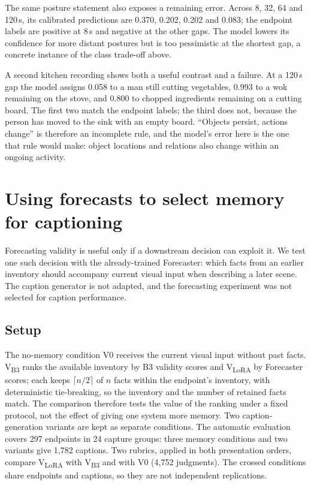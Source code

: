 \documentclass[10pt]{article}
\begin{document}
The same posture statement also exposes a remaining error. Across 8, 32, 64 and 120\,s, its calibrated predictions are 0.370, 0.202, 0.202 and 0.083; the endpoint labels are positive at 8\,s and negative at the other gaps. The model lowers its confidence for more distant postures but is too pessimistic at the shortest gap, a concrete instance of the class trade-off above.

A second kitchen recording shows both a useful contrast and a failure. At a 120\,s gap the model assigns 0.058 to a man still cutting vegetables, 0.993 to a wok remaining on the stove, and 0.800 to chopped ingredients remaining on a cutting board. The first two match the endpoint labels; the third does not, because the person has moved to the sink with an empty board. ``Objects persist, actions change'' is therefore an incomplete rule, and the model's error here is the one that rule would make: object locations and relations also change within an ongoing activity.

\section{Using forecasts to select memory for captioning}
\label{sec:captioning}

Forecasting validity is useful only if a downstream decision can exploit it. We test one such decision with the already-trained Forecaster: which facts from an earlier inventory should accompany current visual input when describing a later scene. The caption generator is not adapted, and the forecasting experiment was not selected for caption performance.

\subsection{Setup}
The no-memory condition V0 receives the current visual input without past facts. V\textsubscript{B3} ranks the available inventory by B3 validity scores and V\textsubscript{LoRA} by Forecaster scores; each keeps $\lceil n/2\rceil$ of $n$ facts within the endpoint's inventory, with deterministic tie-breaking, so the inventory and the number of retained facts match. The comparison therefore tests the value of the ranking under a fixed protocol, not the effect of giving one system more memory. Two caption-generation variants are kept as separate conditions. The automatic evaluation covers 297 endpoints in 24 capture groups: three memory conditions and two variants give 1,782 captions. Two rubrics, applied in both presentation orders, compare V\textsubscript{LoRA} with V\textsubscript{B3} and with V0 (4,752 judgments). The crossed conditions share endpoints and captions, so they are not independent replications.
\end{document}
